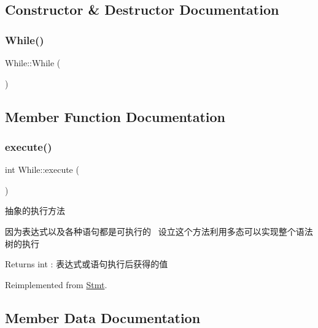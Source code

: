 \subsection{Constructor \& Destructor Documentation}
\mbox{\label{class_while_aacee45c95a102a5a1ec711bbc29c92a7}} 
\subsubsection{\texorpdfstring{While()}{While()}}
{\footnotesize\ttfamily While\+::\+While (\begin{DoxyParamCaption}{ }\end{DoxyParamCaption})\hspace{0.3cm}{\ttfamily [inline]}}



\subsection{Member Function Documentation}
\mbox{\label{class_while_a23b58565983130bb54577f4399ffd822}} 
\subsubsection{\texorpdfstring{execute()}{execute()}}
{\footnotesize\ttfamily int While\+::execute (\begin{DoxyParamCaption}{ }\end{DoxyParamCaption})\hspace{0.3cm}{\ttfamily [virtual]}}



抽象的执行方法 

因为表达式以及各种语句都是可执行的~\newline
设立这个方法利用多态可以实现整个语法树的执行~\newline
 \begin{DoxyReturn}{Returns}
int \+: 表达式或语句执行后获得的值 
\end{DoxyReturn}


Reimplemented from \hyperlink{class_stmt_abdc3261770c3c5bd3ce5b3ba6eedfaa4}{Stmt}.



\subsection{Member Data Documentation}
\mbox{\label{class_while_a14af77714254099c0cc465944ef67dd3}} 
